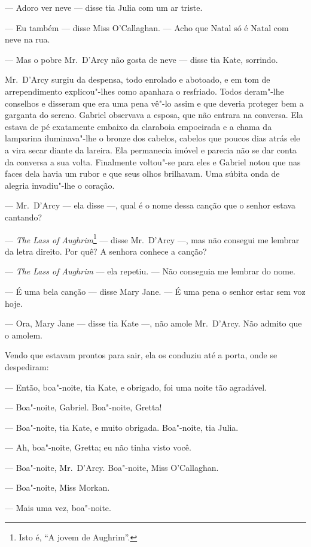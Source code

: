 --- Adoro ver neve --- disse tia Julia com um ar triste.

--- Eu também --- disse Miss O’Callaghan.  --- Acho que Natal só é Natal com
neve na rua.

--- Mas o pobre Mr.~D’Arcy não gosta de neve --- disse tia Kate, sorrindo.

Mr.~D’Arcy surgiu da despensa, todo enrolado e abotoado, e em tom de
arrependimento explicou"-lhes como apanhara o resfriado.  Todos deram"-lhe
conselhos e disseram que era uma pena vê"-lo assim e que deveria proteger bem a
garganta do sereno.  Gabriel observava a esposa, que não entrara na conversa.
Ela estava de pé exatamente embaixo da claraboia empoeirada e a chama da
lamparina iluminava"-lhe o bronze dos cabelos, cabelos que poucos dias atrás ele
a vira secar diante da lareira.  Ela permanecia imóvel e parecia não se dar
conta da conversa a sua volta.  Finalmente voltou"-se para eles e Gabriel notou
que nas faces dela havia um rubor e que seus olhos brilhavam.  Uma súbita onda
de alegria invadiu"-lhe o coração.

--- Mr.~D’Arcy --- ela disse ---, qual é o nome dessa canção que o senhor
estava cantando?

--- \textit{The Lass of Aughrim}\footnote{ Isto é, “A jovem de Aughrim”.} 
--- disse Mr.~D’Arcy ---, mas não consegui me lembrar da letra direito.  Por
quê? A senhora conhece a canção?

--- \textit{The Lass of Aughrim} --- ela repetiu.  --- Não conseguia me lembrar
do nome.

--- É uma bela canção --- disse Mary Jane.  --- É uma pena o senhor estar sem
voz hoje.

--- Ora, Mary Jane --- disse tia Kate ---, não amole Mr.~D’Arcy.  Não admito
que o amolem.

Vendo que estavam prontos para sair, ela os conduziu até a porta, onde se
despediram:

--- Então, boa"-noite, tia Kate, e obrigado, foi uma noite tão agradável.

--- Boa"-noite, Gabriel.  Boa"-noite, Gretta!

--- Boa"-noite, tia Kate, e muito obrigada.  Boa"-noite, tia Julia.

--- Ah, boa"-noite, Gretta; eu não tinha visto você.

--- Boa"-noite, Mr.~D’Arcy.  Boa"-noite, Miss O’Callaghan.

--- Boa"-noite, Miss Morkan.

--- Mais uma vez, boa"-noite.

